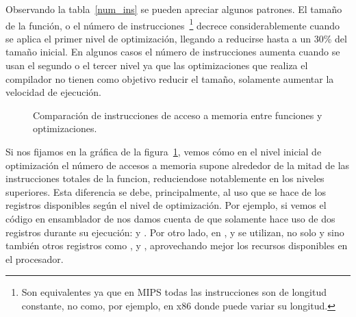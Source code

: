 Observando la tabla~\ref{num_ins} se pueden apreciar algunos patrones. El tamaño de la función, o el número de instrucciones~\footnote{Son equivalentes ya que en MIPS todas las instrucciones son de longitud constante, no como, por ejemplo, en x86 donde puede variar su longitud.} decrece considerablemente cuando se aplica el primer nivel de optimización, llegando a reducirse hasta a un 30\% del tamaño inicial. En algunos casos el número de instrucciones aumenta cuando se usan el segundo o el tercer nivel ya que las optimizaciones que realiza el compilador no tienen como objetivo reducir el tamaño, solamente aumentar la velocidad de ejecución.

\begin{figure}[htbp]
\begin{center}
\end{center}
\caption{Comparación de instrucciones de acceso a memoria entre funciones y optimizaciones.}
\label{graph:memoria}
\end{figure}

Si nos fijamos en la gráfica de la figura~\ref{graph:memoria}, vemos cómo en el nivel inicial de optimización el número de accesos a memoria supone alrededor de la mitad de las instrucciones totales de la funcion, reduciendose notablemente en los niveles superiores. Esta diferencia se debe, principalmente, al uso que se hace de los registros disponibles según el nivel de optimización. Por ejemplo, si vemos el código en ensamblador de  nos damos cuenta de que solamente hace uso de dos registros durante su ejecución:  y . Por otro lado, en ,  y  se utilizan, no solo  y  sino también otros registros como ,  y , aprovechando mejor los recursos disponibles en el procesador.

